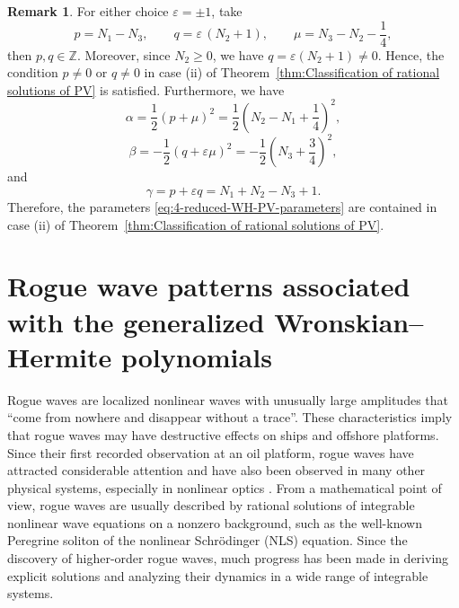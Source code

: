 \documentclass[preprint,3p,10pt]{elsarticle}
\theoremstyle{definition}
\newtheorem{remark}{Remark}[section]
\begin{document}
\begin{remark}
For either choice \(\varepsilon=\pm1\), take
\begin{equation}
    p=N_1-N_3,
    \qquad
    q=\varepsilon\,(N_2+1),
    \qquad
    \mu=N_3-N_2-\frac14,
\end{equation}
then \(p,q\in\mathbb Z\).  Moreover, since \(N_2\ge0\), we have
\(q=\varepsilon(N_2+1)\neq0\). Hence, the condition \(p\neq0\) or
\(q\neq0\) in case (ii)  of Theorem~\ref{thm:Classification of rational solutions of PV} is satisfied.  Furthermore, we have
\begin{equation}
    \alpha=\frac12(p+\mu)^2
    =
    \frac12\left(N_2-N_1+\frac14\right)^2,
\end{equation}
\begin{equation}
    \beta=-\frac12(q+\varepsilon\mu)^2
    =
    -\frac12\left(N_3+\frac34\right)^2,
\end{equation}
and
\begin{equation}
    \gamma=p+\varepsilon q
    =
    N_1+N_2-N_3+1.
\end{equation}
Therefore, the parameters \eqref{eq:4-reduced-WH-PV-parameters} are contained in
case (ii) of Theorem~\ref{thm:Classification of rational solutions of PV}.
\end{remark}



\section{Rogue wave patterns associated with the generalized Wronskian--Hermite polynomials}\label{sec:WH with application}
Rogue waves are localized nonlinear waves with unusually large amplitudes that ``come from nowhere and disappear without a trace''. These characteristics imply that rogue waves may have destructive effects on ships and offshore platforms.  Since their first recorded observation at an oil platform, rogue waves have attracted considerable attention and have also been observed in many other physical systems, especially in nonlinear optics \cite{solli2007optical}. From a mathematical point of view, rogue waves are usually described by rational solutions of integrable nonlinear wave equations on a nonzero background, such as the well-known Peregrine soliton of the nonlinear Schr\"odinger (NLS) equation. Since the discovery of higher-order rogue waves, much progress has been made in deriving explicit solutions and analyzing their dynamics in a wide range of integrable systems. 
\end{document}
